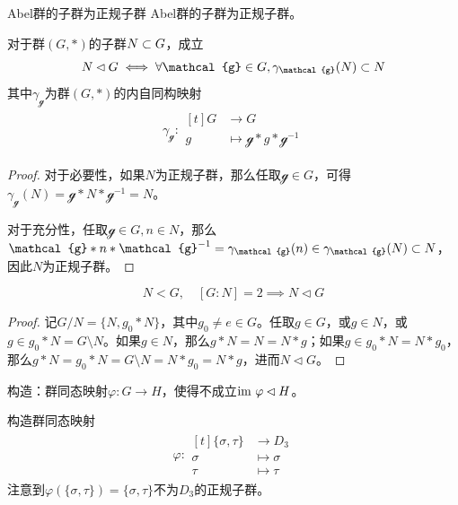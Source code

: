 \begin{proposition}{Abel群的子群为正规子群}
	Abel群的子群为正规子群。
\end{proposition}

\begin{proposition}
	对于群$(G,*)$的子群$N\subset G$，成立
	$$
	N\lhd G\iff \forall \mathcal{g}\in G,\gamma_{\mathcal{g}}(N)\sub N
	$$
	其中$\gamma_{\mathcal{g}}$为群$(G,*)$的内自同构映射
	\begin{align*}
		\gamma_\mathcal{g}:
		\begin{aligned}[t]
			G&\longrightarrow G\\
			g&\longmapsto \mathcal{g}*g*\mathcal{g}^{-1}
		\end{aligned}
	\end{align*}
\end{proposition}

\begin{proof}
	对于必要性，如果$N$为正规子群，那么任取$\mathcal{g}\in G$，可得$\gamma_{\mathcal{g}}(N)=\mathcal{g}*N*\mathcal{g}^{-1}=N$。
	
	对于充分性，任取$\mathcal{g}\in G,n\in N$，那么$\mathcal{g}*n*\mathcal{g}^{-1}=\gamma_{\mathcal{g}}(n)\in\gamma_{\mathcal{g}}(N)\sub N$，因此$N$为正规子群。
\end{proof}

\begin{proposition}
	$$
	N<G,\quad [G:N]=2\implies N\lhd G
	$$
\end{proposition}

\begin{proof}
	记$G/N=\{ N,g_0*N \}$，其中$g_0\ne e\in G$。任取$g\in G$，或$g\in N$，或$g\in g_0*N=G\setminus N$。如果$g\in N$，那么$g*N=N=N*g$；如果$g\in g_0*N=N*g_0$，那么$g*N=g_0*N=G\setminus N=N*g_0=N*g$，进而$N\lhd G$。
\end{proof}

\begin{problem}
	构造：群同态映射$\varphi:G\to H$，使得不成立$\text{im } \varphi\lhd H$。
\end{problem}

\begin{solution}
	构造群同态映射
	\begin{align*}
		\varphi:\begin{aligned}[t]
			\{\sigma,\tau\}&\longrightarrow D_3\\
			\sigma&\longmapsto \sigma\\
			\tau&\longmapsto \tau
		\end{aligned}
	\end{align*}
	注意到$\varphi(\{\sigma,\tau\})=\{\sigma,\tau\}$不为$D_3$的正规子群。
\end{solution}

